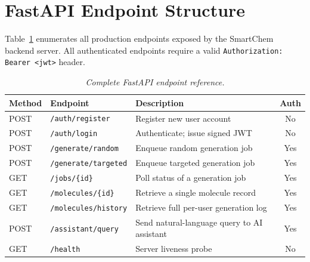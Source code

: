 \documentclass[12pt,a4paper]{report}
\begin{document}
\bigskip
\newpage

\section{FastAPI Endpoint Structure}

Table~\ref{tab:api_endpoints} enumerates all production endpoints exposed by the SmartChem backend server. All authenticated endpoints require a valid \texttt{Authorization: Bearer <jwt>} header.

\begin{table}[htbp]
\centering
\caption{\textit{Complete FastAPI endpoint reference.}}
\label{tab:api_endpoints}
\renewcommand{\arraystretch}{1.15}
\begin{tabular}{lp{4.5cm}p{4.5cm}c}
\hline
\textbf{Method} & \textbf{Endpoint}                    & \textbf{Description}                        & \textbf{Auth} \\
\hline
POST & \texttt{/auth/register}              & Register new user account                   & No \\
POST & \texttt{/auth/login}                 & Authenticate; issue signed JWT              & No \\
POST & \texttt{/generate/random}            & Enqueue random generation job               & Yes \\
POST & \texttt{/generate/targeted}          & Enqueue targeted generation job             & Yes \\
GET  & \texttt{/jobs/\{id\}}                & Poll status of a generation job             & Yes \\
GET  & \texttt{/molecules/\{id\}}           & Retrieve a single molecule record           & Yes \\
GET  & \texttt{/molecules/history}          & Retrieve full per-user generation log       & Yes \\
POST & \texttt{/assistant/query}            & Send natural-language query to AI assistant & Yes \\
GET  & \texttt{/health}                     & Server liveness probe                       & No \\
\hline
\end{tabular}
\end{table}

\bigskip


\end{document}
